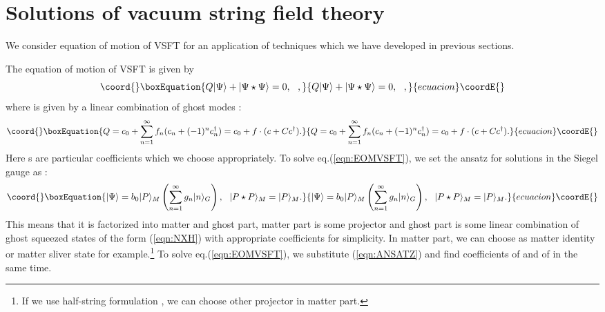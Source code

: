 \documentclass[12pt,a4paper]{article}
\begin{document}
\section{Solutions of vacuum string field theory \label{sec:VSFT}}

We consider equation of motion of VSFT \cite{VSFT} for an application of techniques which we have developed in previous sections.

The equation of motion of VSFT is given by
\begin{equation}\coord{}\boxEquation{
\label{eqn:EOMVSFT}
Q|\Psi\rangle+|\Psi\star\Psi\rangle=0,\ \ ,
}{
Q|\Psi\rangle+|\Psi\star\Psi\rangle=0,\ \ ,
}{ecuacion}\coordE{}\end{equation}
where  \coordHE{} is given by a linear combination of \coordHE{} ghost modes :
\begin{equation}\coord{}\boxEquation{
\label{eqn:VSFTQ}
Q=c_0+\sum_{n=1}^\infty f_n(c_n+(-1)^n c^\dagger_n)=c_0+f\cdot (c+Cc^\dagger).
}{
Q=c_0+\sum_{n=1}^\infty f_n(c_n+(-1)^n c^\dagger_n)=c_0+f\cdot (c+Cc^\dagger).
}{ecuacion}\coordE{}\end{equation}
Here \coordHE{}s are particular coefficients which we choose appropriately.
To solve eq.(\ref{eqn:EOMVSFT}), we set the ansatz for solutions in the Siegel gauge as :
\begin{equation}\coord{}\boxEquation{
\label{eqn:ANSATZ}
|\Psi\rangle=b_0|P\rangle_M\left(\sum_{n=1}^\infty g_n |n \rangle_G\right),\ \ |P\star P\rangle_M=|P\rangle_M.
}{
|\Psi\rangle=b_0|P\rangle_M\left(\sum_{n=1}^\infty g_n |n \rangle_G\right),\ \ |P\star P\rangle_M=|P\rangle_M.
}{ecuacion}\coordE{}\end{equation}
This means that it is factorized into matter and ghost part, matter part is some projector and ghost part is some linear combination of ghost squeezed states of the form (\ref{eqn:NXH}) with appropriate coefficients \coordHE{} for simplicity.
In matter part, we can choose \coordHE{} as matter identity \coordHE{} or matter sliver state \coordHE{} for example.\footnote{
	If we use half-string formulation \cite{HALF}\cite{RSZ}\cite{KOM}, we can choose other projector in matter part.
} To solve eq.(\ref{eqn:EOMVSFT}), we substitute (\ref{eqn:ANSATZ}) and find coefficients \coordHE{} of \myHighlight{$|\Psi\rangle$}\coordHE{} and  \coordHE{} of \coordHE{} in the same time.
\end{document}
